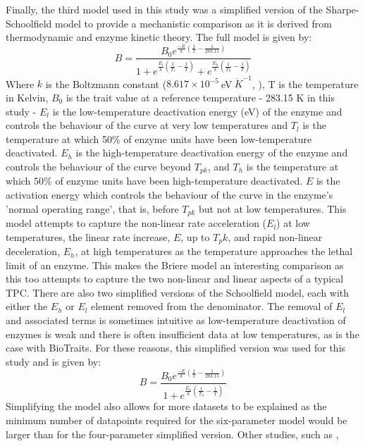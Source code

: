 \documentclass[twoside,twocolumn,11pt]{article}
\begin{document}
Finally, the third model used in this study was a simplified version of the Sharpe-Schoolfield \citep{Schoolfield1981}
model to provide a mechanistic comparison as it is derived from thermodynamic and enzyme 
kinetic theory. The full model is given by:
\begin{equation}
  B = \frac{B_{0}e^{\frac{-E}{k}(\frac{1}{T} - \frac{1}{283.15})}}{1 + e^{\frac{E_l}{k}(\frac{1}{T_l} - \frac{1}{T})} + e^{\frac{E_h}{k}(\frac{1}{T_h} - \frac{1}{T})}}
\end{equation}
Where $k$ is the Boltzmann constant ($8.617 \times 10^{-5}  \ $eV$ \ \dot K^{-1}$, \cite{Boltzmann1872}), 
T is the temperature in Kelvin, $B_0$ is the trait value at a reference temperature - 283.15 K in this study - 
$E_l$ is the low-temperature deactivation energy (eV) of the enzyme 
and controls the behaviour of the curve at very low temperatures and $T_l$ is the temperature at which 50\% of 
enzyme units have been low-temperature deactivated. $E_h$ is the high-temperature deactivation energy of the enzyme and controls 
the behaviour of the curve beyond $T_{pk}$, and $T_h$ is the temperature at which 50\% of enzyme units have been
high-temperature deactivated. $E$ is the activation energy which controls the behaviour of the curve in the enzyme's 
'normal operating range', that is, before $T_{pk}$ but not at low temperatures.
This model attempts to capture the 
non-linear rate acceleration ($E_l$) at low temperatures, the linear rate increase, $E$, up to $T_pk$, and rapid non-linear 
deceleration, $E_h$, at high temperatures as the temperature approaches the lethal limit of an enzyme. This makes the
Briere model an interesting comparison as this too attempts to capture the two non-linear and linear aspects
of a typical TPC. There are also two simplified versions of the Schoolfield model, each with either the $E_h$ or $E_l$ 
element removed from the denominator. The removal of $E_l$ and associated terms is sometimes intuitive as 
low-temperature deactivation of enzymes is weak
and there is often insufficient data at low temperatures, as is the case with BioTraits. For these reasons, this simplified 
version was used for this study and is given by:
\begin{equation}
  B = \frac{B_{0}e^{\frac{-E}{k}(\frac{1}{T} - \frac{1}{283.15})}}{1 + e^{\frac{E_h}{k}(\frac{1}{T_h} - \frac{1}{T})}}
\end{equation}
Simplifying the model also allows for more datasets to be explained as the minimum number of datapoints required for the 
six-parameter model would be larger than for the four-parameter simplified version. Other studies, such as \cite{Alber1993}, 
\end{document}
